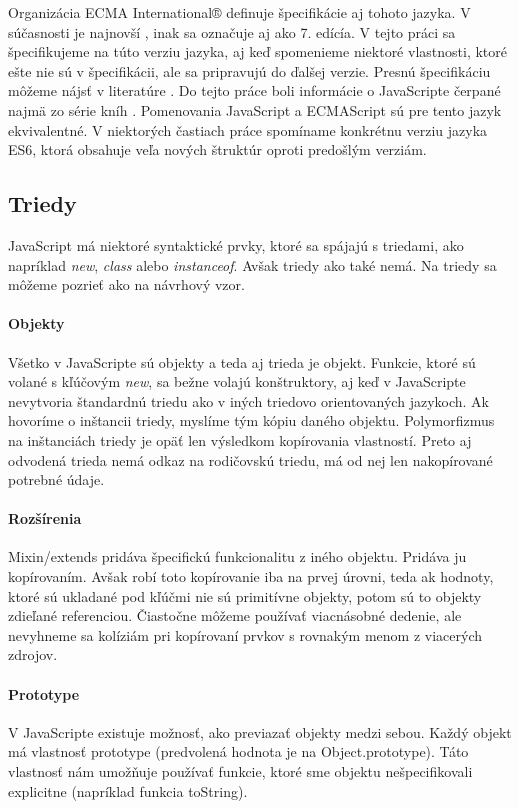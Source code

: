 Organizácia {ECMA International®} definuje špecifikácie aj tohoto jazyka. V súčasnosti je najnovší \JS{}, inak sa označuje aj ako 7. edícía. V tejto práci sa špecifikujeme na túto verziu jazyka, aj keď spomenieme niektoré vlastnosti, ktoré ešte nie sú v špecifikácii, ale sa pripravujú do ďalšej verzie. Presnú špecifikáciu môžeme nájsť v literatúre \cite[\JS{}]{ECMAScript}.
Do tejto práce boli informácie o JavaScripte čerpané najmä zo série kníh \cite[You Don't Know JS]{youDontKnowJS1, youDontKnowJS2, youDontKnowJS3, youDontKnowJS4, youDontKnowJS5, youDontKnowJS6}.
Pomenovania JavaScript a ECMAScript sú pre tento jazyk ekvivalentné.
V niektorých častiach práce spomíname konkrétnu verziu jazyka ES6, ktorá obsahuje veľa nových štruktúr oproti predošlým verziám.

\subsection{Triedy}
JavaScript má niektoré syntaktické prvky, ktoré sa spájajú s triedami, ako napríklad \emph{new}, \emph{class} alebo \emph{instanceof}. Avšak triedy ako také nemá. Na triedy sa môžeme pozrieť ako na návrhový vzor. 

\paragraph{Objekty}
Všetko v JavaScripte sú objekty a teda aj trieda je objekt. Funkcie, ktoré sú volané s kľúčovým \emph{new}, sa bežne volajú konštruktory, aj keď v JavaScripte nevytvoria štandardnú triedu ako v iných triedovo orientovaných jazykoch. 
Ak hovoríme o inštancii triedy, myslíme tým kópiu daného objektu. Polymorfizmus na inštanciách triedy je opäť len výsledkom kopírovania vlastností. Preto aj odvodená trieda nemá odkaz na rodičovskú triedu, má od nej len nakopírované potrebné údaje.

\paragraph{Rozšírenia}
Mixin/extends pridáva špecifickú funkcionalitu z iného objektu. Pridáva ju kopírovaním. Avšak robí toto kopírovanie iba na prvej úrovni, teda ak hodnoty, ktoré sú ukladané pod kľúčmi nie sú primitívne objekty, potom sú to objekty zdieľané referenciou. Čiastočne môžeme používať viacnásobné dedenie, ale nevyhneme sa kolíziám pri kopírovaní prvkov s rovnakým menom z viacerých zdrojov.

\paragraph{Prototype}
V JavaScripte existuje možnosť, ako previazať objekty medzi sebou. Každý objekt má vlastnosť prototype (predvolená hodnota je na Object.prototype). Táto vlastnosť nám umožňuje používať funkcie, ktoré sme objektu nešpecifikovali explicitne (napríklad funkcia toString).

